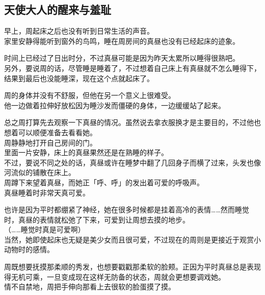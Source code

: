 \subsection{天使大人的醒来与羞耻}

早上，周起床之后也没有听到日常生活的声音。\\

家里安静得能听到窗外的鸟鸣，睡在周房间的真昼也没有已经起床的迹象。

时间上已经过了日出时分，不过真昼可能是因为昨天太累所以睡得很熟吧。\\

另外，要说周的话，尽管睡是睡着了，不过想着自己床上有真昼就不怎么睡得下，结果到最后也没能睡深，现在这个点就起床了。

周的身体并没有不舒服，但他在另一个意义上很难受。\\

他一边做着拉伸好放松因为睡沙发而僵硬的身体，一边缓缓站了起来。

总之周打算先去观察一下真昼的情况。虽然说去拿衣服换才是主要目的，不过他也想着可以顺便准备去看看她。\\

周静静地打开自己房间的门。\\

里面一片安静，床上的真昼果然还是在熟睡的样子。\\

不过，要说不同之处的话，真昼或许在睡梦中翻了几回身子而横了过来，头发也像河流似的铺散在床上。\\

周蹲下来望着真昼，而她正「呼、呼」的发出着可爱的呼吸声。\\

真昼睡着时非常天真可爱。

也许是因为平时都绷紧了神经，她在很多时候都是挂着高冷的表情……然而睡觉时，真昼的表情就松弛了下来，可爱到让周想去摸的地步。\\

（……睡觉时真是可爱啊）\\

当然，她即使起床也无疑是美少女而且很可爱，不过现在的周则是更接近于观赏小动物时的感情。

周既想要抚摸那柔顺的秀发，也想要戳戳那柔软的脸颊。正因为平时真昼总是表现得无机可乘，一旦变成现在这样无防备的状态，周就会更想要调戏她。\\

情不自禁地，周把手伸向那看上去很软的脸蛋摸了摸。\\

